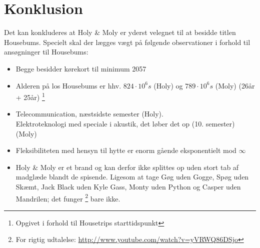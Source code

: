 \section{Konklusion}
Det kan konkluderes at Holy \& Moly \texttrademark er yderst velegnet til at besidde titlen Housebums. Specielt skal der lægges vægt på følgende observationer i forhold til ansøgninger til Housebums:
\begin{itemize}
\item Begge besidder kørekort til minimum 2057
\item Alderen på los Housebums er hhv. $824 \cdot 10^6 s$ (Holy) og $789 \cdot 10^6 s$ (Moly) (26år + 25år) \footnote{Opgivet i forhold til Housetrips starttidspunkt}
\item Telecommunication, næstsidste semester (Holy).\\
Elektroteknologi med speciale i akustik, det løber det op (10. semester) (Moly) 
\item Fleksibiliteten med hensyn til hytte er enorm gående eksponentielt mod $\infty$
\item Holy \& Moly \texttrademark er et brand og kan derfor ikke splittes op uden stort tab af madglæde blandt de spisende. Ligesom at tage Gøg uden Gogge, Spøg uden Skæmt, Jack Black uden Kyle Gass, Monty uden Python og Casper uden Mandrilen; det funger \footnote{For rigtig udtalelse: \url{http://www.youtube.com/watch?v=yVRWQ86DSjo}} bare ikke. 
\end{itemize}